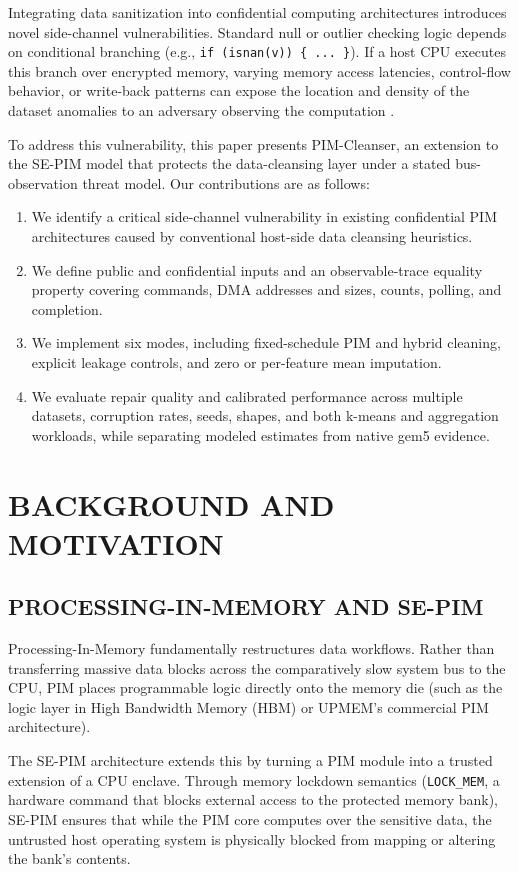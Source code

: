 \documentclass[conference]{IEEEtran}
\begin{document}
Integrating data sanitization into confidential computing architectures introduces novel side-channel vulnerabilities. Standard null or outlier checking logic depends on conditional branching (e.g., \texttt{if (isnan(v)) \{ ... \}}). If a host CPU executes this branch over encrypted memory, varying memory access latencies, control-flow behavior, or write-back patterns can expose the location and density of the dataset anomalies to an adversary observing the computation \cite{Xu:2015,Lee:2017}.

To address this vulnerability, this paper presents PIM-Cleanser, an extension to the SE-PIM model that protects the data-cleansing layer under a stated bus-observation threat model. Our contributions are as follows:
\begin{enumerate}
    \item We identify a critical side-channel vulnerability in existing confidential PIM architectures caused by conventional host-side data cleansing heuristics.
    \item We define public and confidential inputs and an observable-trace equality property covering commands, DMA addresses and sizes, counts, polling, and completion.
    \item We implement six modes, including fixed-schedule PIM and hybrid cleaning, explicit leakage controls, and zero or per-feature mean imputation.
    \item We evaluate repair quality and calibrated performance across multiple datasets, corruption rates, seeds, shapes, and both k-means and aggregation workloads, while separating modeled estimates from native gem5 evidence.
\end{enumerate}

\section{BACKGROUND AND MOTIVATION}

\subsection{PROCESSING-IN-MEMORY AND SE-PIM}
Processing-In-Memory fundamentally restructures data workflows. Rather than transferring massive data blocks across the comparatively slow system bus to the CPU, PIM places programmable logic directly onto the memory die (such as the logic layer in High Bandwidth Memory (HBM) or UPMEM's commercial PIM architecture).

The SE-PIM architecture \cite{Kha:2023} extends this by turning a PIM module into a trusted extension of a CPU enclave. Through memory lockdown semantics (\texttt{LOCK\_MEM}, a hardware command that blocks external access to the protected memory bank), SE-PIM ensures that while the PIM core computes over the sensitive data, the untrusted host operating system is physically blocked from mapping or altering the bank's contents.
\end{document}
